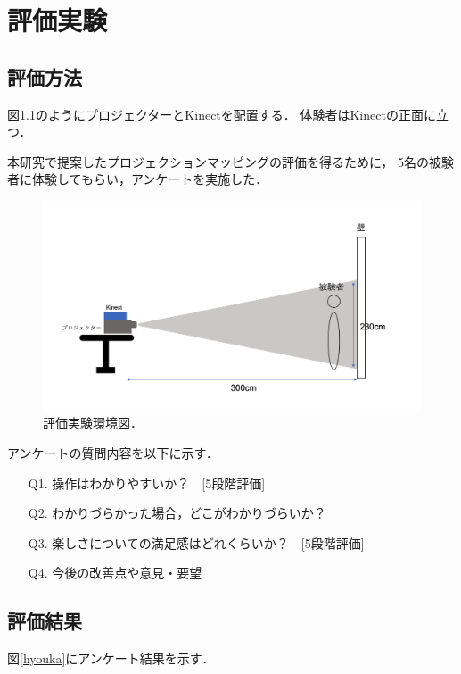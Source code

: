 \chapter{評価実験}
\thispagestyle{fancy}


\section{評価方法}
図\ref{kankyou}のようにプロジェクターとKinectを配置する．
体験者はKinectの正面に立つ．

本研究で提案したプロジェクションマッピングの評価を得るために，
5名の被験者に体験してもらい，アンケートを実施した．

\vspace{1cm}
\begin{figure}[h]
  \centering
  \includegraphics[width=14cm]{image/jikkenkankyou.png}
  \caption[評価実験環境図]{評価実験環境図．}
\label{kankyou}
\end{figure}


\clearpage

アンケートの質問内容を以下に示す．
\begin{itemize}
  \item[Q1.] 操作はわかりやすいか？　[5段階評価]
  \item[Q2.] わかりづらかった場合，どこがわかりづらいか？ 
  \item[Q3.] 楽しさについての満足感はどれくらいか？　[5段階評価]
  \item[Q4.] 今後の改善点や意見・要望   
\end{itemize}



\section{評価結果}
図\ref{hyouka}にアンケート結果を示す．

